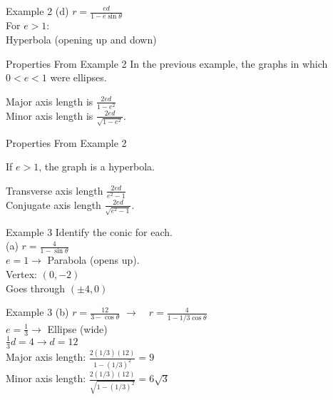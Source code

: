 \documentclass[t,usenames,dvipsnames]{beamer}
\begin{document}
\begin{frame}{Example 2}
(d) \quad   $r = \frac{ed}{1-e\sin\theta}$  \newline\\  \pause
For $e > 1$:    \pause  \newline\\

Hyperbola (opening up and down)
\end{frame}

\begin{frame}{Properties From Example 2}
In the previous example, the graphs in which $0 < e < 1$ were ellipses. \\[18pt]  \pause

Major axis length is $\frac{2ed}{1-e^2}$ \\[18pt] \pause
Minor axis length is $\frac{2ed}{\sqrt{1-e^2}}$.   
\end{frame}

\begin{frame}{Properties From Example 2}

If $e > 1$, the graph is a hyperbola.   \\[18pt] \pause

Transverse axis length $\frac{2ed}{e^2-1}$  \\[18pt]    \pause
Conjugate axis length $\frac{2ed}{\sqrt{e^2-1}}$.
\end{frame}

\begin{frame}{Example 3}
Identify the conic for each.    \newline\\
(a) \quad $r = \frac{4}{1-\sin\theta}$  \newline\\  \pause
$e = 1 \longrightarrow$ Parabola (opens up).   \newline\\  \pause
Vertex: $(0, -2)$   \newline\\  \pause
Goes through $(\pm 4, 0)$
\end{frame}

\begin{frame}{Example 3}
(b) \quad $r = \frac{12}{3-\cos\theta}$ \pause  \quad $\longrightarrow \quad r = \frac{4}{1-1/3\cos\theta}$   \\[18pt] \pause
$e = \frac{1}{3} \longrightarrow$ Ellipse (wide) \\[15pt] \pause
$\frac{1}{3}d = 4 \longrightarrow d = 12$   \\[15pt]  \pause
Major axis length: $\frac{2(1/3)(12)}{1-(1/3)^2} = 9$  \\[15pt]   \pause
Minor axis length: $\frac{2(1/3)(12)}{\sqrt{1-(1/3)^2}} = 6\sqrt{3}$
\end{frame}
\end{document}
